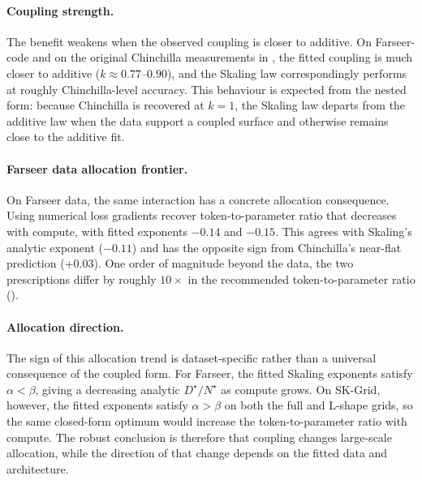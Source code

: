 \documentclass[]{fairmeta}
\newcommand{\ska}{Skaling}
\begin{document}
\paragraph{Coupling strength.}
The benefit weakens when the observed coupling is closer to additive. On Farseer-code and on the original Chinchilla measurements in , the fitted coupling is much closer to additive ($k\approx0.77$--$0.90$), and the \ska{} law correspondingly performs at roughly Chinchilla-level accuracy. This behaviour is expected from the nested form: because Chinchilla is recovered at $k=1$, the \ska{} law departs from the additive law when the data support a coupled surface and otherwise remains close to the additive fit.


\paragraph{Farseer data allocation frontier.}
On Farseer data, the same interaction has a concrete allocation consequence. Using numerical loss gradients recover token-to-parameter ratio that decreases with compute, with fitted exponents $-0.14$ and $-0.15$. This agrees with \ska{}'s analytic exponent ($-0.11$) and has the opposite sign from Chinchilla's near-flat prediction ($+0.03$). One order of magnitude beyond the data, the two prescriptions differ by roughly $10\times$ in the recommended token-to-parameter ratio ().

\paragraph{Allocation direction.}
The sign of this allocation trend is dataset-specific rather than a universal consequence of the coupled form. For Farseer, the fitted \ska{} exponents satisfy $\alpha<\beta$, giving a decreasing analytic $D^\star/N^\star$ as compute grows. On SK-Grid, however, the fitted exponents satisfy $\alpha>\beta$ on both the full and L-shape grids, so the same closed-form optimum would increase the token-to-parameter ratio with compute. The robust conclusion is therefore that coupling changes large-scale allocation, while the direction of that change depends on the fitted data and architecture.
\end{document}
